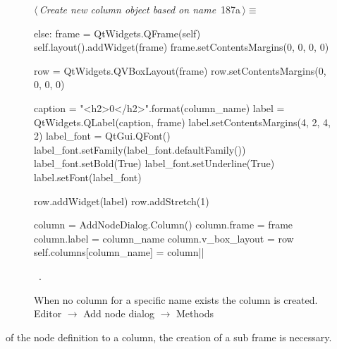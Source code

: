\documentclass[%
    a4paper,    %
    justified,  %
    nobib,      %
    openany     %
]{tufte-book}
\makeatletter
\renewcommand{\label}[1]{\@tufte@label{##1}}%
\makeatother
\begin{document}
\begin{figure}[!htbp]
\begin{flushleft} \small
\begin{minipage}{\linewidth}\label{scrap165}\raggedright\small
{} $\langle\,${\itshape Create new column object based on name}\nobreak\ {\footnotesize {187a}}$\,\rangle\equiv$
\vspace{-1ex}
\begin{pythoncode}
else:
    frame = QtWidgets.QFrame(self)
    self.layout().addWidget(frame)
    frame.setContentsMargins(0, 0, 0, 0)

    row = QtWidgets.QVBoxLayout(frame)
    row.setContentsMargins(0, 0, 0, 0)

    caption = "<h2>{0}</h2>".format(column_name)
    label = QtWidgets.QLabel(caption, frame)
    label.setContentsMargins(4, 2, 4, 2)
    label_font = QtGui.QFont()
    label_font.setFamily(label_font.defaultFamily())
    label_font.setBold(True)
    label_font.setUnderline(True)
    label.setFont(label_font)

    row.addWidget(label)
    row.addStretch(1)

    column = AddNodeDialog.Column()
    column.frame = frame
    column.label = column_name
    column.v_box_layout = row
    self.columns[column_name] = column|\NWsep|
\end{pythoncode}
\vspace{1.5ex}
\footnotesize
\begin{list}{}{\setlength{\itemsep}{-\parsep}\setlength{\itemindent}{-\leftmargin}}
\item \NWtxtMacroRefIn\ .

\item{}
\end{list}
\end{minipage}\vspace{4ex}
\end{flushleft}
\caption{When no column for a specific name exists the column is created.
  \newline{}\newline{}Editor $\rightarrow$ Add node dialog $\rightarrow$ Methods}
\end{figure}

 of the node definition to a column,
the creation of a sub frame is necessary.
\end{document}
